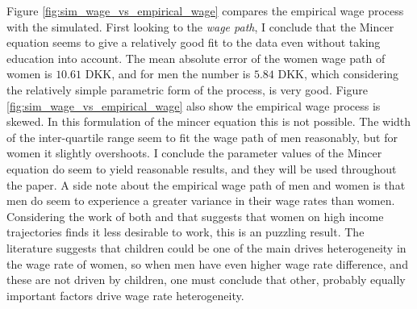 Figure \ref{fig:sim_wage_vs_empirical_wage} compares the empirical wage process with the simulated. First looking to the \textit{wage path}, I conclude that the Mincer equation seems to give a relatively good fit to the data even without taking education into account. The mean absolute error of the women wage path of women is $10.61$ DKK, and for men the number is $5.84$ DKK, which considering the relatively simple parametric form of the process, is very good. Figure \ref{fig:sim_wage_vs_empirical_wage} also  show the empirical wage process is skewed. In this formulation of the mincer equation this is not possible. The width of the inter-quartile range seem to fit the wage path of men reasonably, but for women it slightly overshoots. I conclude the parameter values of the Mincer equation do seem to yield reasonable results, and they will be used throughout the paper. A side note about the empirical wage path of men and women is that men do seem to experience a greater variance in their wage rates than women. Considering the work of both \textcite{francesconi_joint_2002} and \textcite{gayle_life-cyle_2006} that suggests that women on high income trajectories finds it less desirable to work, this is an puzzling result. The literature suggests that children could be one of the main drives heterogeneity in the wage rate of women, so when men have even higher wage rate difference, and these are not driven by children, one must conclude that other, probably equally important factors drive wage rate heterogeneity.

